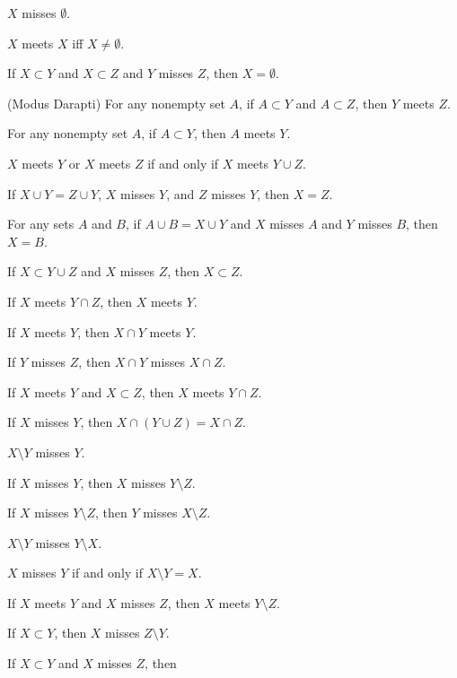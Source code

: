 \documentclass{article}
\begin{document}
\begin{thm}
\item\label{xboole1:65} $X$ misses $\emptyset$.
\item\label{xboole1:66} $X$ meets $X$ iff $X\neq\emptyset$.
\item\label{xboole1:67} If $X\subset Y$ and $X\subset Z$ and $Y$ misses $Z$,
  then $X=\emptyset$.
\item\label{xboole1:68} (Modus Darapti) For any nonempty set $A$,
  if $A\subset Y$ and $A\subset Z$, then $Y$ meets $Z$.
\item\label{xboole1:69} For any nonempty set $A$, if $A\subset Y$, then
  $A$ meets $Y$.
\item\label{xboole1:70} $X$ meets $Y$ or $X$ meets $Z$ if and only if
  $X$ meets $Y\cup Z$.
\item\label{xboole1:71} If $X\cup Y=Z\cup Y$, $X$ misses $Y$, and $Z$
  misses $Y$, then $X=Z$.
\item\label{xboole1:72} For any sets $A$ and $B$, if $A\cup B=X\cup Y$
  and $X$ misses $A$ and $Y$ misses $B$, then $X=B$.
\item\label{xboole1:73} If $X\subset Y\cup Z$ and $X$ misses $Z$, then
  $X\subset Z$.
\item\label{xboole1:74} If $X$ meets $Y\cap Z$, then $X$ meets $Y$.
\item\label{xboole1:75} If $X$ meets $Y$, then $X\cap Y$ meets $Y$.
\item\label{xboole1:76} If $Y$ misses $Z$, then $X\cap Y$ misses $X\cap Z$.
\item\label{xboole1:77} If $X$ meets $Y$ and $X\subset Z$, then $X$
  meets $Y\cap Z$.
\item\label{xboole1:78} If $X$ misses $Y$, then $X\cap(Y\cup Z)=X\cap Z$.
\item\label{xboole1:79} $X\setminus Y$ misses $Y$.
\item\label{xboole1:80} If $X$ misses $Y$, then $X$ misses $Y\setminus Z$.
\item\label{xboole1:81} If $X$ misses $Y\setminus Z$, then $Y$ misses $X\setminus Z$.
\item\label{xboole1:82} $X\setminus Y$ misses $Y\setminus X$.
\item\label{xboole1:83} $X$ misses $Y$ if and only if $X\setminus Y=X$.
\item\label{xboole1:84} If $X$ meets $Y$ and $X$ misses $Z$, then $X$
  meets $Y\setminus Z$.
\item\label{xboole1:85} If $X\subset Y$, then $X$ misses $Z\setminus Y$.
\item\label{xboole1:86} If $X\subset Y$ and $X$ misses $Z$, then

\end{thm}
\end{document}
